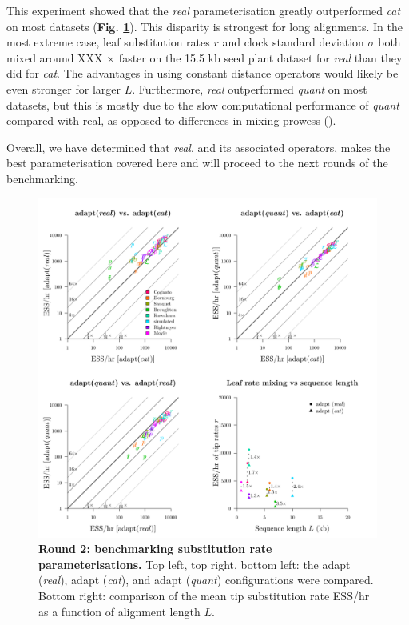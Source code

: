 \documentclass[10pt,letterpaper]{article}
\begin{document}
This experiment showed that the \textit{real} parameterisation greatly outperformed \textit{cat} on most datasets (\textbf{Fig. \ref{fig:round2Results}}).
This disparity is strongest for long alignments.
In the most extreme case, leaf substitution rates $r$ and clock standard deviation $\sigma$ both mixed around XXX $\times$ faster on the 15.5 kb seed plant dataset \cite{Ran_2018} for \textit{real} than they did for \textit{cat}.
The advantages in using constant distance operators would likely be even stronger for larger $L$.
Furthermore, \textit{real} outperformed \textit{quant} on most datasets, but this is mostly due to the slow computational performance of \textit{quant} compared with real, as opposed to differences in mixing prowess (\textbf{}).

Overall, we have determined that \textit{real}, and its associated operators, makes the best parameterisation covered here and will proceed to the next rounds of the benchmarking.



\begin{figure}[!h]
\includegraphics[width=\textwidth]{benchmarking/benchmarkingVM/ESS_round2.pdf}
\caption{\textbf{Round 2: benchmarking substitution rate parameterisations.} Top left, top right, bottom left: the adapt (\textit{real}), adapt (\textit{cat}), and adapt (\textit{quant}) configurations were compared. Bottom right: comparison of the mean tip substitution rate ESS/hr as a function of alignment length $L$. }
\label{fig:round2Results}
\end{figure}
\end{document}
